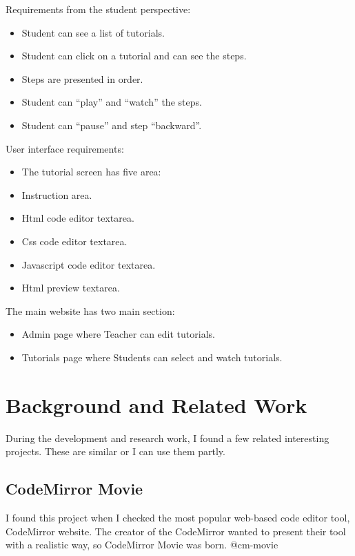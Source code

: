 Requirements from the student perspective:

\begin{itemize}
\item
  Student can see a list of tutorials.
\item
  Student can click on a tutorial and can see the steps.
\item
  Steps are presented in order.
\item
  Student can ``play'' and ``watch'' the steps.
\item
  Student can ``pause'' and step ``backward''.
\end{itemize}

User interface requirements:

\begin{itemize}
\item
  The tutorial screen has five area:
\item
  Instruction area.
\item
  Html code editor textarea.
\item
  Css code editor textarea.
\item
  Javascript code editor textarea.
\item
  Html preview textarea.
\end{itemize}

The main website has two main section:

\begin{itemize}
\item
  Admin page where Teacher can edit tutorials.
\item
  Tutorials page where Students can select and watch tutorials.
\end{itemize}

\section{Background and Related Work}\label{background-and-related-work}

During the development and research work, I found a few related
interesting projects. These are similar or I can use them partly.

\subsection{CodeMirror Movie}\label{codemirror-movie}

I found this project when I checked the most popular web-based code
editor tool, CodeMirror website. The creator of the CodeMirror wanted to
present their tool with a realistic way, so CodeMirror Movie was born.
@cm-movie

